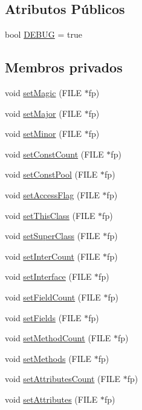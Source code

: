\subsection*{Atributos Públicos}
\begin{DoxyCompactItemize}
\item 
bool \hyperlink{class_class_loader_a0aa9112b221bbc7680236be7eb5b4c45}{D\+E\+B\+UG} = true
\end{DoxyCompactItemize}
\subsection*{Membros privados}
\begin{DoxyCompactItemize}
\item 
void \hyperlink{class_class_loader_a9e756ef58a13aab63472a9b343710327}{set\+Magic} (F\+I\+LE $\ast$fp)
\item 
void \hyperlink{class_class_loader_afd21ab61a4ea4d2fda29319e37a7886e}{set\+Major} (F\+I\+LE $\ast$fp)
\item 
void \hyperlink{class_class_loader_ad2bd2b993bdbc080f77a9f5e76744fd7}{set\+Minor} (F\+I\+LE $\ast$fp)
\item 
void \hyperlink{class_class_loader_a22735292f1ed1c1b101111f013524a06}{set\+Const\+Count} (F\+I\+LE $\ast$fp)
\item 
void \hyperlink{class_class_loader_a09a097315d78f50dc7522811e256978f}{set\+Const\+Pool} (F\+I\+LE $\ast$fp)
\item 
void \hyperlink{class_class_loader_a78a667283feda0933eabf1d8f601fa30}{set\+Access\+Flag} (F\+I\+LE $\ast$fp)
\item 
void \hyperlink{class_class_loader_aa089d3175ca27ac5e0efa2f6c26c4df5}{set\+This\+Class} (F\+I\+LE $\ast$fp)
\item 
void \hyperlink{class_class_loader_a011a4cfdd1995fa34718a549ca467b0a}{set\+Super\+Class} (F\+I\+LE $\ast$fp)
\item 
void \hyperlink{class_class_loader_a25c897efbe0542a8603f2dfa29943881}{set\+Inter\+Count} (F\+I\+LE $\ast$fp)
\item 
void \hyperlink{class_class_loader_a18bc96df21925d9da172c64205736ea5}{set\+Interface} (F\+I\+LE $\ast$fp)
\item 
void \hyperlink{class_class_loader_aedeaf814e3cf232978ce7e0b135c93b0}{set\+Field\+Count} (F\+I\+LE $\ast$fp)
\item 
void \hyperlink{class_class_loader_a3a544b1a25a445bbf4ce7e5d84a2a90a}{set\+Fields} (F\+I\+LE $\ast$fp)
\item 
void \hyperlink{class_class_loader_aa744ed99b82e912547af903ea13fa3dd}{set\+Method\+Count} (F\+I\+LE $\ast$fp)
\item 
void \hyperlink{class_class_loader_ab47e37f5d359a067182c1a181e9db54e}{set\+Methods} (F\+I\+LE $\ast$fp)
\item 
void \hyperlink{class_class_loader_ae1dff6712251163173291991f52ac8fa}{set\+Attributes\+Count} (F\+I\+LE $\ast$fp)
\item 
void \hyperlink{class_class_loader_adac675675241b8c2892ebfbf5b902d33}{set\+Attributes} (F\+I\+LE $\ast$fp)
\end{DoxyCompactItemize}
